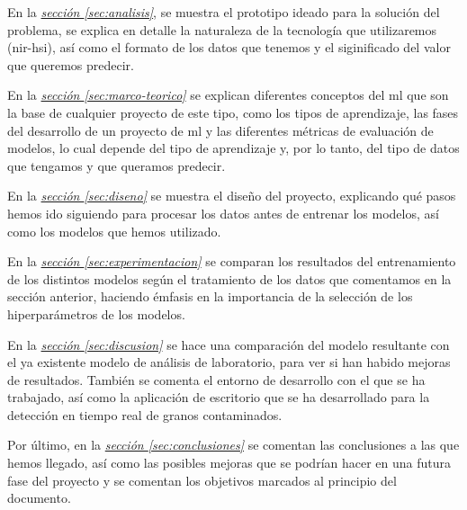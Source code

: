 En la \textit{\hyperref[sec:analisis]{sección \ref*{sec:analisis}}}, se muestra el prototipo ideado para la solución del problema, se explica en detalle la naturaleza de la tecnología que utilizaremos (\gls{nir-hsi}), así como el formato de los datos que tenemos y el siginificado del valor que queremos predecir.

En la \textit{\hyperref[sec:marco-teorico]{sección \ref*{sec:marco-teorico}}} se explican diferentes conceptos del \gls{ml} que son la base de cualquier proyecto de este tipo, como los tipos de aprendizaje, las fases del desarrollo de un proyecto de \gls{ml} y las diferentes métricas de evaluación de modelos, lo cual depende del tipo de aprendizaje y, por lo tanto, del tipo de datos que tengamos y que queramos predecir.

En la \textit{\hyperref[sec:diseno]{sección \ref*{sec:diseno}}} se muestra el diseño del proyecto, explicando qué pasos hemos ido siguiendo para procesar los datos antes de entrenar los modelos, así como los modelos que hemos utilizado.

En la \textit{\hyperref[sec:experimentacion]{sección \ref*{sec:experimentacion}}} se comparan los resultados del entrenamiento de los distintos modelos según el tratamiento de los datos que comentamos en la sección anterior, haciendo émfasis en la importancia de la selección de los hiperparámetros de los modelos.

En la \textit{\hyperref[sec:discusion]{sección \ref*{sec:discusion}}} se hace una comparación del modelo resultante con el ya existente modelo de análisis de laboratorio, para ver si han habido mejoras de resultados. También se comenta el entorno de desarrollo con el que se ha trabajado, así como la aplicación de escritorio que se ha desarrollado para la detección en tiempo real de granos contaminados.

Por último, en la \textit{\hyperref[sec:conclusiones]{sección \ref*{sec:conclusiones}}} se comentan las conclusiones a las que hemos llegado, así como las posibles mejoras que se podrían hacer en una futura fase del proyecto y se comentan los objetivos marcados al principio del documento.
